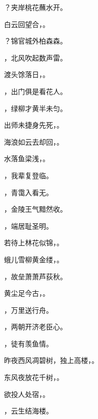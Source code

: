 \documentclass[12pt, a4paper, addpoints]{exam}
\begin{document}
\begin{questions}
\question[2] \uline{\qquad\qquad\qquad\qquad}？夹岸桃花蘸水开。

\question[2] 白云回望合，\uline{\qquad\qquad\qquad\qquad}。

\question[2] \uline{\qquad\qquad\qquad\qquad}？锦官城外柏森森。

\question[2] \uline{\qquad\qquad\qquad\qquad}，北风吹起数声雷。

\question[2] 渡头馀落日，\uline{\qquad\qquad\qquad\qquad}。

\question[2] \uline{\qquad\qquad\qquad\qquad}，出门俱是看花人。

\question[2] \uline{\qquad\qquad\qquad\qquad}，绿柳才黄半未匀。

\question[2] 出师未捷身先死，\uline{\qquad\qquad\qquad\qquad}。

\question[2] 海浪如云去却回，\uline{\qquad\qquad\qquad\qquad}。

\question[2] 水落鱼梁浅，\uline{\qquad\qquad\qquad\qquad}。

\question[2] \uline{\qquad\qquad\qquad\qquad}，我辈复登临。

\question[2] \uline{\qquad\qquad\qquad\qquad}，青霭入看无。

\question[2] \uline{\qquad\qquad\qquad\qquad}，金陵王气黯然收。

\question[2] \uline{\qquad\qquad\qquad\qquad}，端居耻圣明。

\question[2] 若待上林花似锦，\uline{\qquad\qquad\qquad\qquad}。

\question[2] 蛾儿雪柳黄金缕，\uline{\qquad\qquad\qquad\qquad}。

\question[2] \uline{\qquad\qquad\qquad\qquad}，故垒萧萧芦荻秋。

\question[2] 黄尘足今古，\uline{\qquad\qquad\qquad\qquad}。

\question[2] \uline{\qquad\qquad\qquad\qquad}，万里送行舟。

\question[2] \uline{\qquad\qquad\qquad\qquad}，两朝开济老臣心。

\question[2] \uline{\qquad\qquad\qquad\qquad}，徒有羡鱼情。

\question[2] 昨夜西风凋碧树，独上高楼，\uline{\qquad\qquad\qquad\qquad}。

\question[2] 东风夜放花千树，\uline{\qquad\qquad\qquad\qquad}。

\question[2] 欲投人处宿，\uline{\qquad\qquad\qquad\qquad}。

\question[2] \uline{\qquad\qquad\qquad\qquad}，云生结海楼。


\end{questions}
\end{document}
